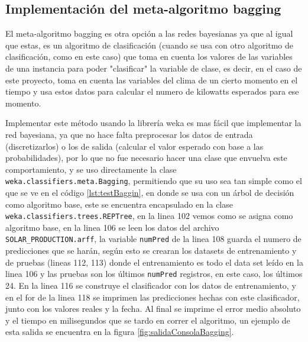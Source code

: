 \subsection{Implementación del meta-algoritmo bagging}
El meta-algoritmo bagging es otra opción a las redes bayesianas ya que al igual que estas, es un algoritmo de clasificación (cuando se usa con otro algoritmo de clasificación, como en este caso) que toma en cuenta los valores de las variables de una instancia para poder "clasificar" la variable de clase, es decir, en el caso de este proyecto, toma en cuenta las variables del clima de un cierto momento en el tiempo y usa estos datos para calcular el numero de kilowatts esperados para ese momento.

Implementar este método usando la librería weka es mas fácil que implementar la red bayesiana, ya que no hace falta preprocesar los datos de entrada (discretizarlos) o los de salida (calcular el valor esperado con base a las probabilidades), por lo que no fue necesario hacer una clase que envuelva este comportamiento, y se uso directamente la clase \texttt{weka.classifiers.meta.Bagging}, permitiendo que su uso sea tan simple como el que se ve en el código \ref{lst:testBaggin}, 
en donde se usa con un árbol de decisión como algoritmo base, este se encuentra encapsulado en la clase \texttt{weka.classifiers.trees.REPTree}, en la linea 102 vemos como se asigna como algoritmo base, en la linea 106 se leen los datos del archivo \texttt{SOLAR\_PRODUCTION.arff}, 
la variable \texttt{numPred} de la linea 108 guarda el numero de predicciones que se harán, según esto se crearan los datasets de entrenamiento y de pruebas (lineas 112, 113) donde el entrenamiento es todo el data set leído en la linea 106 y las pruebas son los últimos \texttt{numPred} registros, en este caso, los últimos 24. 
En la linea 116 se construye el clasificador con los datos de entrenamiento, y en el for de la linea 118 se imprimen las predicciones hechas con este clasificador, junto con los valores reales y la fecha.
Al final se imprime el error medio absoluto y el tiempo en milisegundos que se tardo en correr el algoritmo, un ejemplo de esta salida se encuentra en la figura \ref{fig:salidaConsolaBagging}.


